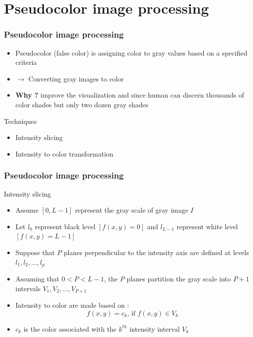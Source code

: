 \documentclass{beamer}
\begin{document}
\section{Pseudocolor image processing}
\begin{frame}
\frametitle{Pseudocolor image processing}
\begin{itemize}
\item Pseudocolor (false color) is assigning color to gray values based on a specified criteria 
\item $\rightarrow$ Converting gray images to color
\item \textbf{Why ?} improve the visualization and since human can discern thousands of color shades but only two dozen gray shades  
\end{itemize}
\begin{block}{Techniques}
\begin{itemize}
\item Intensity slicing
\item Intensity to color transformation
\end{itemize}
\end{block}
\end{frame}
\begin{frame}
\frametitle{Pseudocolor image processing}
\begin{block}{Intensity slicing}
\footnotesize{
\begin{itemize}
\item Assume $[0, L-1]$ represent the gray scale of gray image $I$
\item Let $l_{0}$ represent black level $[f(x,y) = 0 ]$ and $l_{L-1}$ represent white level $[f(x,y) = L-1]$
\item Suppose that $P$ planes perpendicular to the intensity axis are defined at levels $l_{1}, l_{2}, ..., l_{p}$
\item Assuming that $0 < P < L-1$, the $P$ planes partition the gray scale into $P+1$ intervals $V_{1}, V_{2}, ..., V_{P+1}$
\item Intensity to color are made based on : 
$$ f(x,y) = c_{k} \text{,  if } f(x,y)\in V_{k} $$
\item $c_{k}$ is the color associated with the $k^{th}$ intensity interval $V_{k}$
\end{itemize}
}
\end{block}
\end{frame}
\end{document}
